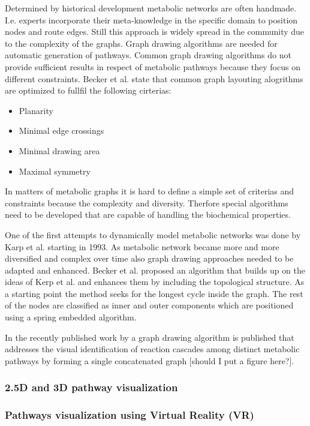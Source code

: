 Determined by historical development metabolic networks are often handmade. I.e. experts incorporate their meta-knowledge in the specific domain to position nodes and route edges. Still this approach is widely spread in the community due to the complexity of the graphs. Graph drawing algorithms are needed for automatic generation of pathways. Common graph drawing algorithms do not provide sufficient results in respect of metabolic pathways because they focus on different constraints\citep{Becker2001}. Becker et al. state that common graph layouting alogrithms are optimized to fullfil the following cirterias:
\begin{itemize}
 \item Planarity
 \item Minimal edge crossings
 \item Minimal drawing area
 \item Maximal symmetry
\end{itemize}
In matters of metabolic graphs it is hard to define a simple set of criterias and constraints because the complexity and diversity. Therfore special algorithms need to be developed that are capable of handling the biochemical properties.

One of the first attempts to dynamically model metabolic networks was done by Karp et al. starting in 1993\citep{Karp1993, Karp1994, Karp1994a}. As metabolic network became more and more diversified and complex over time also graph drawing approaches needed to be adapted and enhanced. Becker et al. proposed an algorithm that builds up on the ideas of Kerp et al. and enhances them by including the topological structure. As a starting point the method seeks for the longest cycle inside the graph. The rest of the nodes are classified as inner and outer components which are positioned using a spring embedded algorithm.

In the recently published work by \citep{Bourqui2006} a graph drawing algorithm is published that addresses the visual identification of reaction cascades among distinct metabolic pathways by forming a single concatenated graph [should I put a figure here?].

\subsubsection{2.5D and 3D pathway visualization}


\subsubsection{Pathways visualization using Virtual Reality (VR)}


